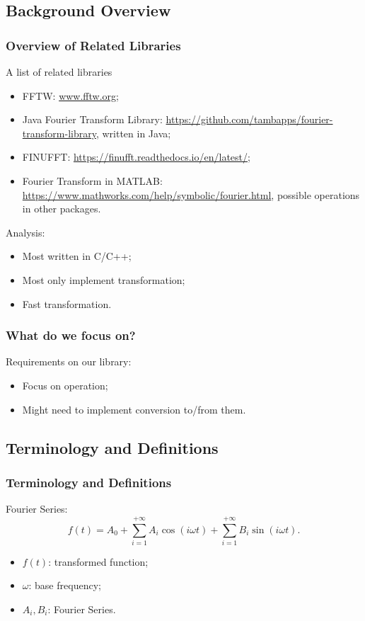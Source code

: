 \documentclass{beamer}
\begin{document}
	\subsection{Background Overview}
	\begin{frame}
		\frametitle{Overview of Related Libraries}
			A list of related libraries
		\begin{itemize}
			\item FFTW: \url{www.fftw.org};
			\item Java Fourier Transform Library: \url{https://github.com/tambapps/fourier-transform-library}, written in Java;
			\item FINUFFT: \url{https://finufft.readthedocs.io/en/latest/};
			\item Fourier Transform in MATLAB:
			\url{https://www.mathworks.com/help/symbolic/fourier.html}, possible operations in other packages.
		\end{itemize}
		Analysis:
		\begin{itemize}
			\item Most written in C/C++;
			\item Most only implement transformation;
			\item Fast transformation.
		\end{itemize}

	\end{frame}

	\begin{frame}
	\frametitle{What do we focus on?}
		Requirements on our library:
\begin{itemize}
	\item Focus on operation;
	\item Might need to implement conversion to/from them.
\end{itemize}
	\end{frame}

	\subsection{Terminology and Definitions}
	\begin{frame}
		\frametitle{Terminology and Definitions}
		Fourier Series:
		\begin{equation}
			f(t) = A_0+\sum_{i=1}^{+\infty}A_i\cos(i\omega t)+\sum_{i=1}^{+\infty}B_i\sin(i\omega t).
		\end{equation}
		\begin{itemize}
			\item $f(t)$: transformed function;
			\item $\omega$: base frequency;
			\item $A_i, B_i$: Fourier Series.
		\end{itemize}
	\end{frame}
\end{document}
